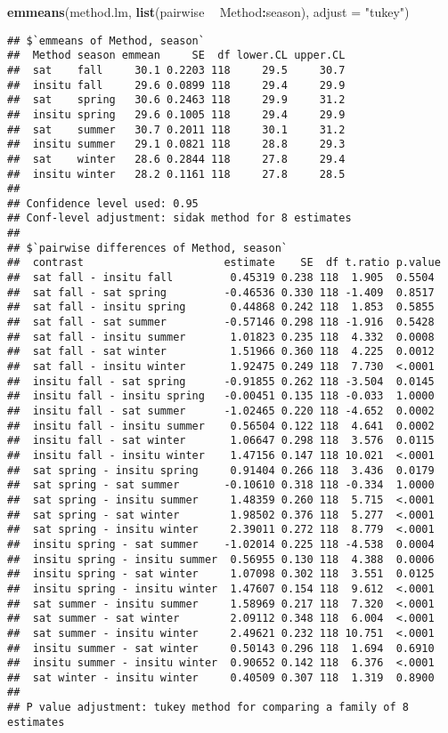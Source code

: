 \documentclass[
]{article}
\newenvironment{Shaded}{\begin{snugshade}}{\end{snugshade}}
\newcommand{\DataTypeTok}[1]{\textcolor[rgb]{0.13,0.29,0.53}{#1}}
\newcommand{\KeywordTok}[1]{\textcolor[rgb]{0.13,0.29,0.53}{\textbf{#1}}}
\newcommand{\NormalTok}[1]{#1}
\newcommand{\OperatorTok}[1]{\textcolor[rgb]{0.81,0.36,0.00}{\textbf{#1}}}
\newcommand{\StringTok}[1]{\textcolor[rgb]{0.31,0.60,0.02}{#1}}
\begin{document}
\begin{Shaded}
\begin{Highlighting}[]
\KeywordTok{emmeans}\NormalTok{(method.lm, }\KeywordTok{list}\NormalTok{(pairwise }\OperatorTok{~}\StringTok{ }\NormalTok{Method}\OperatorTok{:}\NormalTok{season), }\DataTypeTok{adjust =} \StringTok{"tukey"}\NormalTok{)}
\end{Highlighting}
\end{Shaded}

\begin{verbatim}
## $`emmeans of Method, season`
##  Method season emmean     SE  df lower.CL upper.CL
##  sat    fall     30.1 0.2203 118     29.5     30.7
##  insitu fall     29.6 0.0899 118     29.4     29.9
##  sat    spring   30.6 0.2463 118     29.9     31.2
##  insitu spring   29.6 0.1005 118     29.4     29.9
##  sat    summer   30.7 0.2011 118     30.1     31.2
##  insitu summer   29.1 0.0821 118     28.8     29.3
##  sat    winter   28.6 0.2844 118     27.8     29.4
##  insitu winter   28.2 0.1161 118     27.8     28.5
## 
## Confidence level used: 0.95 
## Conf-level adjustment: sidak method for 8 estimates 
## 
## $`pairwise differences of Method, season`
##  contrast                      estimate    SE  df t.ratio p.value
##  sat fall - insitu fall         0.45319 0.238 118  1.905  0.5504 
##  sat fall - sat spring         -0.46536 0.330 118 -1.409  0.8517 
##  sat fall - insitu spring       0.44868 0.242 118  1.853  0.5855 
##  sat fall - sat summer         -0.57146 0.298 118 -1.916  0.5428 
##  sat fall - insitu summer       1.01823 0.235 118  4.332  0.0008 
##  sat fall - sat winter          1.51966 0.360 118  4.225  0.0012 
##  sat fall - insitu winter       1.92475 0.249 118  7.730  <.0001 
##  insitu fall - sat spring      -0.91855 0.262 118 -3.504  0.0145 
##  insitu fall - insitu spring   -0.00451 0.135 118 -0.033  1.0000 
##  insitu fall - sat summer      -1.02465 0.220 118 -4.652  0.0002 
##  insitu fall - insitu summer    0.56504 0.122 118  4.641  0.0002 
##  insitu fall - sat winter       1.06647 0.298 118  3.576  0.0115 
##  insitu fall - insitu winter    1.47156 0.147 118 10.021  <.0001 
##  sat spring - insitu spring     0.91404 0.266 118  3.436  0.0179 
##  sat spring - sat summer       -0.10610 0.318 118 -0.334  1.0000 
##  sat spring - insitu summer     1.48359 0.260 118  5.715  <.0001 
##  sat spring - sat winter        1.98502 0.376 118  5.277  <.0001 
##  sat spring - insitu winter     2.39011 0.272 118  8.779  <.0001 
##  insitu spring - sat summer    -1.02014 0.225 118 -4.538  0.0004 
##  insitu spring - insitu summer  0.56955 0.130 118  4.388  0.0006 
##  insitu spring - sat winter     1.07098 0.302 118  3.551  0.0125 
##  insitu spring - insitu winter  1.47607 0.154 118  9.612  <.0001 
##  sat summer - insitu summer     1.58969 0.217 118  7.320  <.0001 
##  sat summer - sat winter        2.09112 0.348 118  6.004  <.0001 
##  sat summer - insitu winter     2.49621 0.232 118 10.751  <.0001 
##  insitu summer - sat winter     0.50143 0.296 118  1.694  0.6910 
##  insitu summer - insitu winter  0.90652 0.142 118  6.376  <.0001 
##  sat winter - insitu winter     0.40509 0.307 118  1.319  0.8900 
## 
## P value adjustment: tukey method for comparing a family of 8 estimates
\end{verbatim}
\end{document}
